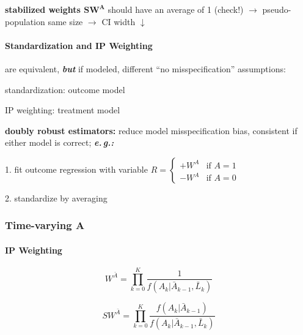 \documentclass[8pt,oneside]{extarticle}
\begin{document}
\begin{multicols}{2}
\noindent \textbf{stabilized weights $\boldsymbol{SW^A}$} should have an average of 1 (check!) $\rightarrow$ pseudo-population same size $\rightarrow$ CI width $\downarrow$

\paragraph{\large Standardization and IP Weighting}

are equivalent, \textit{\textbf{but}} if modeled, different ``no misspecification'' assumptions:

standardization: outcome model

IP weighting: treatment model

\noindent \textbf{doubly robust estimators:} reduce model misspecification bias, consistent if either model is correct; \textbf{\textit{e.\,g.:}} \vspace{-0.9em}

1. fit outcome regression with variable $R = \begin{cases} +W^A & \text{if } A{=}1 \\ -W^A & \text{if } A{=}0 \end{cases}$ \vspace{-0.9em}

2. standardize by averaging



\subsubsection{Time-varying A}







\paragraph{\large IP Weighting} 

$$ W^{\bar{A}} = \prod_{k=0}^K \frac{1}{f\left(A_k|\bar{A}_{k-1}, \bar{L}_k\right)}$$


$$ SW^{\bar{A}} = \prod_{k=0}^K \frac{f\left(A_k|\bar{A}_{k-1}\right)}{f\left(A_k|\bar{A}_{k-1}, \bar{L}_k\right)}$$


\end{multicols}
\end{document}
